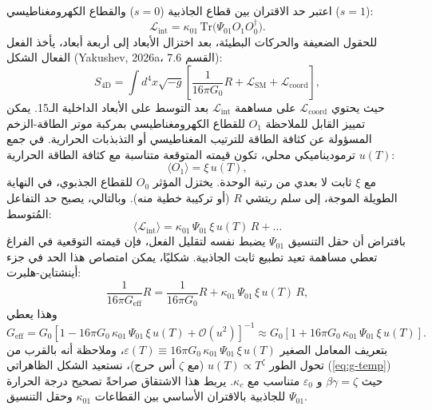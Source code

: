 \documentclass[11pt,a4paper]{article}
\newcommand{\eps}{\varepsilon}
\newcommand{\kappac}{\kappa_c}
\newcommand{\lagr}{\mathcal{L}}
\begin{document}
	اعتبر حد الاقتران بين قطاع الجاذبية ($s=0$) والقطاع الكهرومغناطيسي ($s=1$):
	\begin{equation}
		\lagr_{\text{int}} = \kappa_{01} \, \mathrm{Tr}\big(\Psi_{01} O_1 O_0^\dagger\big).
	\end{equation}
	للحقول الضعيفة والحركات البطيئة، بعد اختزال الأبعاد إلى أربعة أبعاد، يأخذ الفعل الفعال الشكل (Yakushev, 2026a، القسم 7.6):
	\begin{equation}
		S_{\text{4D}} = \int d^4x \sqrt{-g} \left[ \frac{1}{16\pi G_0} R + \mathcal{L}_{\text{SM}} + \mathcal{L}_{\text{coord}} \right],
	\end{equation}
	حيث يحتوي $\mathcal{L}_{\text{coord}}$ على مساهمة $\lagr_{\text{int}}$ بعد التوسط على الأبعاد الداخلية الـ15. يمكن تمييز القابل للملاحظة $O_1$ للقطاع الكهرومغناطيسي بمركبة موتر الطاقة-الزخم المسؤولة عن كثافة الطاقة للترتيب المغناطيسي أو التذبذبات الحرارية. في جمع ترموديناميكي محلي، تكون قيمته المتوقعة متناسبة مع كثافة الطاقة الحرارية $u(T)$:
	\begin{equation}
		\langle O_1 \rangle = \xi \, u(T),
	\end{equation}
	مع $\xi$ ثابت لا بعدي من رتبة الوحدة. يختزل المؤثر $O_0$ للقطاع الجذبوي، في النهاية الطويلة الموجة، إلى سلم ريتشي $R$ (أو تركيبة خطية منه). وبالتالي، يصبح حد التفاعل المُتوسط:
	\begin{equation}
		\langle \lagr_{\text{int}} \rangle = \kappa_{01} \, \Psi_{01} \, \xi \, u(T) \, R + \dots
	\end{equation}
	بافتراض أن حقل التنسيق $\Psi_{01}$ يضبط نفسه لتقليل الفعل، فإن قيمته التوقعية في الفراغ تعطي مساهمة تعيد تطبيع ثابت الجاذبية. شكليًا، يمكن امتصاص هذا الحد في جزء أينشتاين-هلبرت:
	\begin{equation}
		\frac{1}{16\pi G_{\text{eff}}} R = \frac{1}{16\pi G_0} R + \kappa_{01} \, \Psi_{01} \, \xi \, u(T) \, R,
	\end{equation}
	وهذا يعطي
	\begin{equation}
		G_{\text{eff}} = G_0 \left[ 1 - 16\pi G_0 \, \kappa_{01} \, \Psi_{01} \, \xi \, u(T) + \mathcal{O}(u^2) \right]^{-1} \approx G_0 \left[ 1 + 16\pi G_0 \, \kappa_{01} \, \Psi_{01} \, \xi \, u(T) \right].
	\end{equation}
	بتعريف المعامل الصغير $\eps(T) \equiv 16\pi G_0 \, \kappa_{01} \, \Psi_{01} \, \xi \, u(T)$، وملاحظة أنه بالقرب من تحول الطور $u(T) \propto T^{\zeta}$ (مع $\zeta$ أس حرج)، نستعيد الشكل الظاهراتي (\ref{eq:g-temp}) حيث $\beta\gamma = \zeta$ و $\eps_0$ متناسب مع $\kappac$. يربط هذا الاشتقاق صراحةً تصحيح درجة الحرارة للجاذبية بالاقتران الأساسي بين القطاعات $\kappa_{01}$ وحقل التنسيق $\Psi_{01}$.
	
\end{document}
